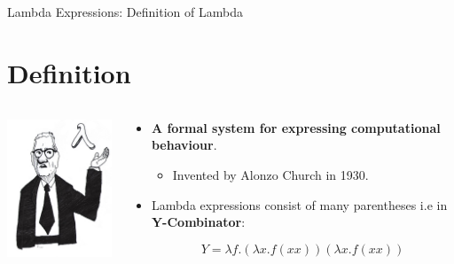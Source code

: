 \documentclass{beamer}
\begin{document}
	\begin{frame}{Lambda Expressions: Definition of Lambda}
		\section{Definition}
		\begin{columns}
    			\begin{column}{0.3\textwidth}
					\centering
					\includegraphics[width=4cm]{church}	
    			\end{column}
    			\begin{column}{0.7\textwidth}
					
					\begin{itemize}
						\item \textbf{A formal system for expressing computational behaviour}.
						\begin{itemize}
						\item Invented by Alonzo Church in 1930.	
						\end{itemize}
						\item Lambda expressions consist of many parentheses i.e in \textbf{Y-Combinator}:					
					
						\[ Y = \lambda f. (\lambda x. f (x x))(\lambda x. f (x x)) \]
					\end{itemize}
    			\end{column}
		\end{columns}
	\end{frame}	
\end{document}

